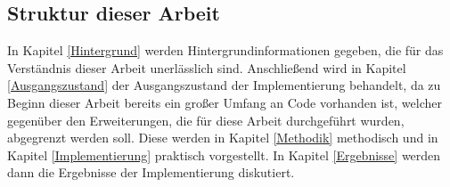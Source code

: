 \subsection{Struktur dieser Arbeit}
In Kapitel \ref{Hintergrund} werden Hintergrundinformationen gegeben, die für das Verständnis dieser Arbeit unerlässlich sind. Anschließend wird in Kapitel \ref{Ausgangszustand} der Ausgangszustand der Implementierung behandelt, da zu Beginn dieser Arbeit bereits ein großer Umfang an Code vorhanden ist, welcher gegenüber den Erweiterungen, die für diese Arbeit durchgeführt wurden, abgegrenzt werden soll. Diese werden in Kapitel \ref{Methodik} methodisch und in Kapitel \ref{Implementierung} praktisch vorgestellt. In Kapitel \ref{Ergebnisse} werden dann die Ergebnisse der Implementierung diskutiert.